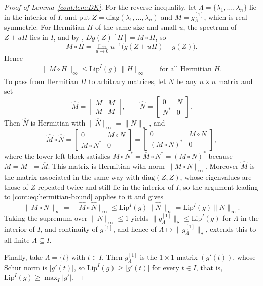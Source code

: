 \begin{proof}[Proof of Lemma~\ref{cont:lem:DK}]
For the reverse inequality, let $\Lambda=\{\lambda_1,\dots,\lambda_n\}$ lie in the interior of $I$, and put $Z=\mathrm{diag}(\lambda_1,\dots,\lambda_n)$ and $M=g^{[1]}_\Lambda$, which is real symmetric. For Hermitian $H$ of the same size and small $u$, the spectrum of $Z+uH$ lies in $I$, and by \cite[Theorem~3.25]{hiaipetz2014intro}, $Dg(Z)[H]=M\circ H$, so
\[
  M\circ H=\lim_{u\to0}u^{-1}\big(g(Z+uH)-g(Z)\big).
\]
Hence
\begin{align}\label{cont:eq:hermitian-bound}
  \|M\circ H\|_\infty\leq\mathrm{Lip}^I(g)\,\|H\|_\infty\qquad\text{for all Hermitian }H.
\end{align}
To pass from Hermitian $H$ to arbitrary matrices, let $N$ be any $n\times n$ matrix and set
\[
  \widehat M=\begin{bmatrix}M&M\\M&M\end{bmatrix},\qquad
  \widehat N=\begin{bmatrix}0&N\\N^*&0\end{bmatrix}.
\]
Then $\widehat N$ is Hermitian with $\|\widehat N\|_\infty=\|N\|_\infty$, and
\[
  \widehat M\circ\widehat N=\begin{bmatrix}0&M\circ N\\M\circ N^*&0\end{bmatrix}
  =\begin{bmatrix}0&M\circ N\\(M\circ N)^*&0\end{bmatrix},
\]
where the lower-left block satisfies $M\circ N^*=\overline{M}\circ N^*=(M\circ N)^*$ because $M=M^\top=\overline M$. This matrix is Hermitian with norm $\|M\circ N\|_\infty$. Moreover $\widehat M$ is the matrix associated in the same way with $\mathrm{diag}(Z,Z)$, whose eigenvalues are those of $Z$ repeated twice and still lie in the interior of $I$, so the argument leading to \eqref{cont:eq:hermitian-bound} applies to it and gives
\[
  \|M\circ N\|_\infty=\|\widehat M\circ\widehat N\|_\infty\leq\mathrm{Lip}^I(g)\|\widehat N\|_\infty=\mathrm{Lip}^I(g)\|N\|_\infty.
\]
Taking the supremum over $\|N\|_\infty\leq1$ yields $\|g^{[1]}_\Lambda\|_{\mathrm S}\leq\mathrm{Lip}^I(g)$ for $\Lambda$ in the interior of $I$, and continuity of $g^{[1]}$, and hence of $\Lambda\mapsto\|g^{[1]}_\Lambda\|_{\mathrm S}$, extends this to all finite $\Lambda\subseteq I$.

Finally, take $\Lambda=\{t\}$ with $t\in I$. Then $g^{[1]}_\Lambda$ is the $1\times1$ matrix $(g'(t))$, whose Schur norm is $|g'(t)|$, so $\mathrm{Lip}^I(g)\geq|g'(t)|$ for every $t\in I$, that is, $\mathrm{Lip}^I(g)\geq\max_I|g'|$.
\end{proof}
 
